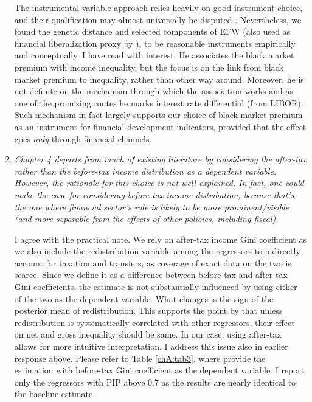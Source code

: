 \begin{enumerate}
    The instrumental variable approach relies heavily on good instrument choice, and their qualification may almost universally be disputed \parencite{deaton2010instruments}. Nevertheless, we found the genetic distance and selected components of EFW (also used as financial liberalization proxy by \textcite{de2017finance}), to be reasonable instruments empirically and conceptually. I have read \textcite{sylwester2003changes} with interest. He associates the black market premium with income inequality, but the focus is on the link from black market premium to inequality, rather than other way around. Moreover, he is not definite on the mechanism through which the association works and as one of the promising routes he marks interest rate differential (from LIBOR). Such mechanism in fact largely supports our choice of black market premium as an instrument for financial development indicators, provided that the effect goes \emph{only} through financial channels. 
        
    \item \textit{Chapter 4 departs from much of existing literature by considering the after-tax rather than the before-tax income distribution as a dependent variable. However, the rationale for this choice is not well explained. In fact, one could make the case for considering before-tax income distribution, because that's the one where financial sector's role is likely to be more prominent/visible (and more separable from the effects of other policies, including fiscal).}
    
    I agree with the practical note. We rely on after-tax income Gini coefficient as we also include the redistribution variable among the regressors to indirectly account for taxation and transfers, as coverage of exact data on the two is scarce. Since we define it as a difference between before-tax and after-tax Gini coefficients, the estimate is not substantially influenced by using either of the two as the dependent variable. What changes is the sign of the posterior mean of redistribution. This supports the point by \textcite{furceri2019robust} that unless redistribution is systematically correlated with other regressors, their effect on net and gross inequality should be same. In our case, using after-tax allows for more intuitive interpretation. I address this issue also in earlier response above. Please refer to Table \ref{chA:tab3}, where provide the estimation with before-tax Gini coefficient as the dependent variable. I report only the regressors with \ac{PIP} above 0.7 as the results are nearly identical to the baseline estimate. 


\end{enumerate}
